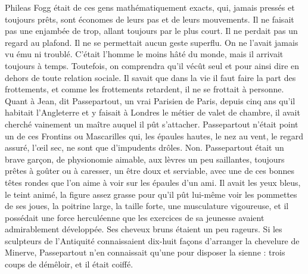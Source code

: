 \documentclass[12pt,a4paper,openany]{book}
\begin{document}
                Phileas Fogg était de ces gens mathématiquement exacts, qui, jamais pressés et toujours prêts, sont économes de leurs pas et de leurs mouvements. Il ne faisait pas une enjambée de trop, allant toujours par le plus court. Il ne perdait pas un regard au plafond. Il ne se permettait aucun geste superflu. On ne l’avait jamais vu ému ni troublé. C’était l’homme le moins hâté du monde, mais il arrivait toujours à temps. Toutefois, on comprendra qu’il vécût seul et pour ainsi dire en dehors de toute relation sociale. Il savait que dans la vie il faut faire la part des frottements, et comme les frottements retardent, il ne se frottait à personne.
                Quant à Jean, dit Passepartout, un vrai Parisien de Paris, depuis cinq ans qu’il habitait l’Angleterre et y faisait à Londres le métier de valet de chambre, il avait cherché vainement un maître auquel il pût s’attacher.
                Passepartout n’était point un de ces Frontins ou Mascarilles qui, les épaules hautes, le nez au vent, le regard assuré, l’œil sec, ne sont que d’impudents drôles. Non. Passepartout était un brave garçon, de physionomie aimable, aux lèvres un peu saillantes, toujours prêtes à goûter ou à caresser, un être doux et serviable, avec une de ces bonnes têtes rondes que l’on aime à voir sur les épaules d’un ami. Il avait les yeux bleus, le teint animé, la figure assez grasse pour qu’il pût lui-même voir les pommettes de ses joues, la poitrine large, la taille forte, une musculature vigoureuse, et il possédait une force herculéenne que les exercices de sa jeunesse avaient admirablement développée. Ses cheveux bruns étaient un peu rageurs. Si les sculpteurs de l’Antiquité connaissaient dix-huit façons d’arranger la chevelure de Minerve, Passepartout n’en connaissait qu’une pour disposer la sienne : trois coups de démêloir, et il était coiffé.
\end{document}
